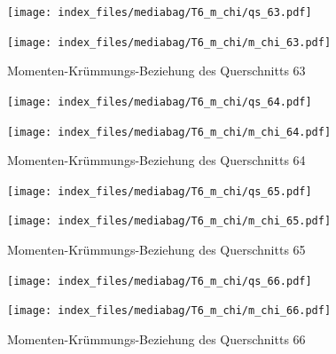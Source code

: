 \documentclass[
  11pt,
  letterpaper,
]{scrreprt}
\begin{document}
\begin{figure}[H]

\begin{minipage}{0.50\linewidth}
\texttt{[image: index\_files/mediabag/T6\_m\_chi/qs\_63.pdf]}\end{minipage}%
%
\begin{minipage}{0.50\linewidth}
\texttt{[image: index\_files/mediabag/T6\_m\_chi/m\_chi\_63.pdf]}\end{minipage}%

\caption{\label{fig-mchi_anhang}Momenten-Krümmungs-Beziehung des
Querschnitts 63}

\end{figure}%

\begin{figure}[H]

\begin{minipage}{0.50\linewidth}
\texttt{[image: index\_files/mediabag/T6\_m\_chi/qs\_64.pdf]}\end{minipage}%
%
\begin{minipage}{0.50\linewidth}
\texttt{[image: index\_files/mediabag/T6\_m\_chi/m\_chi\_64.pdf]}\end{minipage}%

\caption{\label{fig-mchi_anhang}Momenten-Krümmungs-Beziehung des
Querschnitts 64}

\end{figure}%

\begin{figure}[H]

\begin{minipage}{0.50\linewidth}
\texttt{[image: index\_files/mediabag/T6\_m\_chi/qs\_65.pdf]}\end{minipage}%
%
\begin{minipage}{0.50\linewidth}
\texttt{[image: index\_files/mediabag/T6\_m\_chi/m\_chi\_65.pdf]}\end{minipage}%

\caption{\label{fig-mchi_anhang}Momenten-Krümmungs-Beziehung des
Querschnitts 65}

\end{figure}%

\begin{figure}[H]

\begin{minipage}{0.50\linewidth}
\texttt{[image: index\_files/mediabag/T6\_m\_chi/qs\_66.pdf]}\end{minipage}%
%
\begin{minipage}{0.50\linewidth}
\texttt{[image: index\_files/mediabag/T6\_m\_chi/m\_chi\_66.pdf]}\end{minipage}%

\caption{\label{fig-mchi_anhang}Momenten-Krümmungs-Beziehung des
Querschnitts 66}

\end{figure}%
\end{document}
